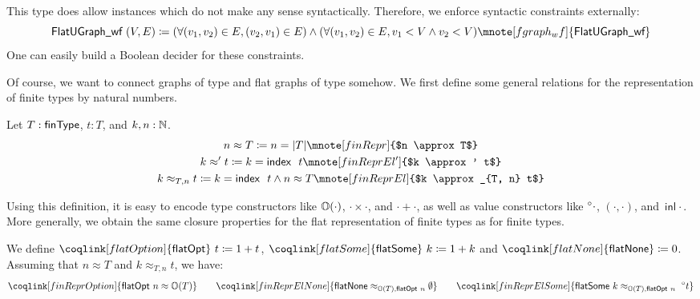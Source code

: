 This type does allow instances which do not make any sense syntactically. Therefore, we enforce syntactic constraints externally:
\[\textsf{FlatUGraph\shortunderscore{}wf}~(V, E) \defeq (\forall (v_1, v_2) \in E, (v_2, v_1) \in E) \land (\forall (v_1, v_2) \in E, v_1 < V \land v_2 < V)\mnote[fgraph_wf]{\textsf{FlatUGraph\shortunderscore{}wf}} \]
One can easily build a Boolean decider for these constraints. 

Of course, we want to connect graphs of type \UGraph{} and flat graphs of type \FlatUGraph{} somehow. We first define some general relations for the representation of finite types by natural numbers. 

\begin{definition}
  Let $T : \textsf{finType}$, $t : T$, and $k, n : \mathbb{N}$. 
  \begin{gather*}
    n \approx T \defeq n = \length{T} \mnote[finRepr]{$n \approx T$}\\
    k \approx' t \defeq k = \findex~t \mnote[finReprEl']{$k \approx' t$}\\
    k \approx_{T, n} t \defeq k = \findex~t \land n \approx T \mnote[finReprEl]{$k \approx_{T, n} t$}
  \end{gather*}
\end{definition}

Using this definition, it is easy to encode type constructors like $\mathbb{O}{(\cdot)}$, $\cdot \times \cdot$, and $\cdot + \cdot$, as well as value constructors like $\prescript{\circ}{}\cdot$, $( \cdot, \cdot)$, and $\textsf{inl}~\cdot$. More generally, we obtain the same closure properties for the flat representation of finite types as for finite types.

\begin{example}
  We define $\coqlink[flatOption]{\textsf{flatOpt}}~t \defeq \natS{t}$, $\coqlink[flatSome]{\textsf{flatSome}}~k \defeq \natS{k}$ and $\coqlink[flatNone]{\textsf{flatNone}} \defeq 0$. 
  Assuming that $n \approx T$ and $k \approx_{T, n} t$, we have:
  \begin{align*}
    \coqlink[finReprOption]{\textsf{flatOpt}~n \approx \opt{T}}
    \qquad \coqlink[finReprElNone]{\textsf{flatNone} \approx_{\opt{T}, \textsf{flatOpt}~n} \ONone}
    \qquad \coqlink[finReprElSome]{\textsf{flatSome}~k \approx_{\opt{T}, \textsf{flatOpt}~n}~\OSome{t}} 
  \end{align*}
\end{example}

